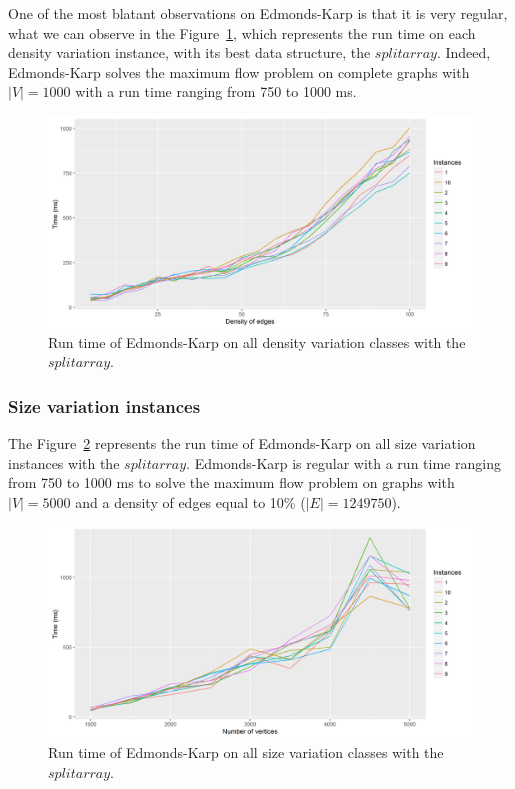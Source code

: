One of the most blatant observations on Edmonds-Karp is that it is very regular, what we can observe in the Figure~\ref{fig:EKmean}, which represents the run time on each density variation instance, with its best data structure, the $split array$. Indeed, Edmonds-Karp solves the maximum flow problem on complete graphs with $|V|=1000$ with a run time ranging from 750 to 1000 ms.
\begin{figure}[H]
\begin{center}
\includegraphics[scale=0.6]{images/results/EKmean.png}
\caption{Run time of Edmonds-Karp on all density variation classes with the $split array$.}
\label{fig:EKmean}
\end{center}
\end{figure}


\subsubsection{Size variation instances}
The Figure~\ref{fig:EKmeansize} represents the run time of Edmonds-Karp on all size variation instances with the $split array$. Edmonds-Karp is regular with a run time ranging from 750 to 1000 ms to solve the maximum flow problem on graphs with $|V|=5000$ and a density of edges equal to 10\% ($|E|=1249750$).
\begin{figure}[H]
\begin{center}
\includegraphics[scale=0.55]{images/results/EKmeansize2.png}
\caption{Run time of Edmonds-Karp on all size variation classes with the $split array$.}
\label{fig:EKmeansize}
\end{center}
\end{figure}


